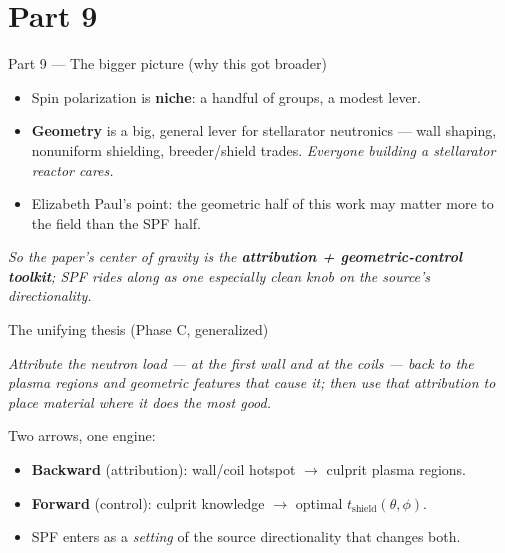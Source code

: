 \documentclass[11pt,aspectratio=169]{beamer}
\newcommand{\key}[1]{\textcolor{key}{\textbf{#1}}}
\newcommand{\qq}[1]{\begin{center}\emph{#1}\end{center}}
\begin{document}
\section{Part 9}
\begin{frame}{Part 9 --- The bigger picture (why this got broader)}
\begin{itemize}
\item Spin polarization is \key{niche}: a handful of groups, a modest lever.
\item \key{Geometry} is a big, general lever for stellarator neutronics --- wall shaping,
      nonuniform shielding, breeder/shield trades. \emph{Everyone building a stellarator
      reactor cares.}
\item Elizabeth Paul's point: the geometric half of this work may matter more to the field
      than the SPF half.
\end{itemize}
\qq{So the paper's center of gravity is the \key{attribution + geometric-control toolkit};
SPF rides along as one especially clean knob on the source's directionality.}
\end{frame}

\begin{frame}{The unifying thesis (Phase C, generalized)}
\qq{Attribute the neutron load --- at the first wall \emph{and} at the coils --- back to the
plasma regions and geometric features that cause it; then use that attribution to place
material where it does the most good.}
\medskip

Two arrows, one engine:
\begin{itemize}\footnotesize
\item \key{Backward} (attribution): wall/coil hotspot $\to$ culprit plasma regions.
\item \key{Forward} (control): culprit knowledge $\to$ optimal \(t_{\text{shield}}(\theta,\phi)\).
\item SPF enters as a \emph{setting} of the source directionality that changes both.
\end{itemize}
\end{frame}

\end{document}

